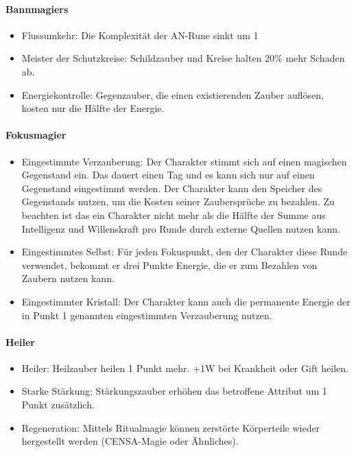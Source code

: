 \documentclass{article}
\begin{document}
\paragraph{Bannmagiers}

\begin{itemize}
\item Flussumkehr: Die Komplexität der AN-Rune sinkt um 1
\item Meister der Schutzkreise: Schildzauber und Kreise halten 20\% mehr Schaden ab.
\item Energiekontrolle: Gegenzauber, die einen existierenden Zauber auflösen, kosten nur die Hälfte der Energie.
\end{itemize}

\paragraph{Fokusmagier}

\begin{itemize}
\item Eingestimmte Verzauberung: Der Charakter stimmt sich auf einen magischen Gegenstand ein. Das dauert einen Tag und es kann sich nur auf einen Gegenstand eingestimmt werden. Der Charakter kann den Speicher des Gegenstands nutzen, um die Kosten seiner Zaubersprüche zu bezahlen. Zu beachten ist das ein Charakter nicht mehr als die Hälfte der Summe aus Intelligenz und Willenskraft pro Runde durch externe Quellen nutzen kann.
\item Eingestimmtes Selbst: Für jeden Fokuspunkt, den der Charakter diese Runde verwendet, bekommt er drei Punkte Energie, die er zum Bezahlen von Zaubern nutzen kann.
\item Eingestimmter Kristall: Der Charakter kann auch die permanente Energie der in Punkt 1 genannten eingestimmten Verzauberung nutzen.
\end{itemize}

\paragraph{Heiler}

\begin{itemize}
\item Heiler: Heilzauber heilen 1 Punkt mehr. +1W bei Krankheit oder Gift heilen.
\item Starke Stärkung: Stärkungszauber erhöhen das betroffene Attribut um 1 Punkt zusätzlich.
\item Regeneration: Mittels Ritualmagie können zerstörte Körperteile wieder hergestellt werden (CENSA-Magie oder Ähnliches).
\end{itemize}
\end{document}
